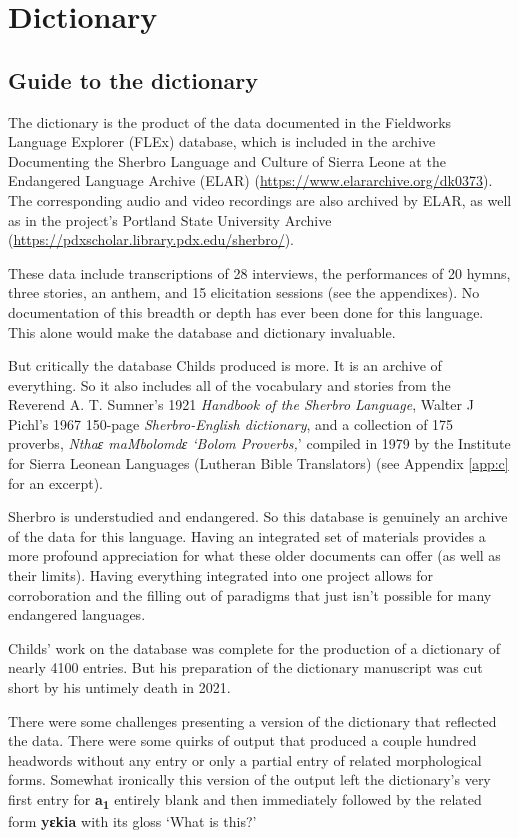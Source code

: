 \chapter{Dictionary}
\label{app:a}
\section{Guide to the dictionary}

The dictionary is the product of the data documented in the Fieldworks Language Explorer (FLEx) database, which is included in the archive Documenting the Sherbro Language and Culture of Sierra Leone at the Endangered Language Archive (ELAR) (\url{https://www.elararchive.org/dk0373}). The corresponding audio and video recordings are also archived by ELAR, as well as in the project’s Portland State University Archive (\url{https://pdxscholar.library.pdx.edu/sherbro/}). 

These data include transcriptions of 28 interviews, the performances of 20 hymns, three stories, an anthem, and 15 elicitation sessions (see the appendixes). No documentation of this breadth or depth has ever been done for this language. This alone would make the database and dictionary invaluable.

But critically the database Childs produced is more. It is an archive of everything. So it also includes all of the vocabulary and stories from the Reverend A. T. Sumner’s 1921 \textit{Handbook of the Sherbro Language}, Walter J Pichl’s 1967 150-page \textit{Sherbro-English dictionary}, and a collection of 175 proverbs, \textit{Nthaɛ maMbolomdɛ ‘Bolom Proverbs,}’ compiled in 1979 by the Institute for Sierra Leonean Languages (Lutheran Bible Translators) (see Appendix \ref{app:c} for an excerpt). 

Sherbro is understudied and endangered. So this database is genuinely an archive of the data for this language. Having an integrated set of materials provides a more profound appreciation for what these older documents can offer (as well as their limits). Having everything integrated into one project allows for corroboration and the filling out of paradigms that just isn’t possible for many endangered languages. 

Childs’ work on the database was complete for the production of a dictionary of nearly 4100 entries. But his preparation of the dictionary manuscript was cut short by his untimely death in 2021. 

There were some challenges presenting a version of the dictionary that reflected the data. There were some quirks of output that produced a couple hundred headwords without any entry or only a partial entry of related morphological forms. Somewhat ironically this version of the output left the dictionary’s very first entry for \textbf{a\textsubscript{1}} entirely blank and then immediately followed by the related form  \textbf{yɛkia} with its gloss ‘What is this?’ 

